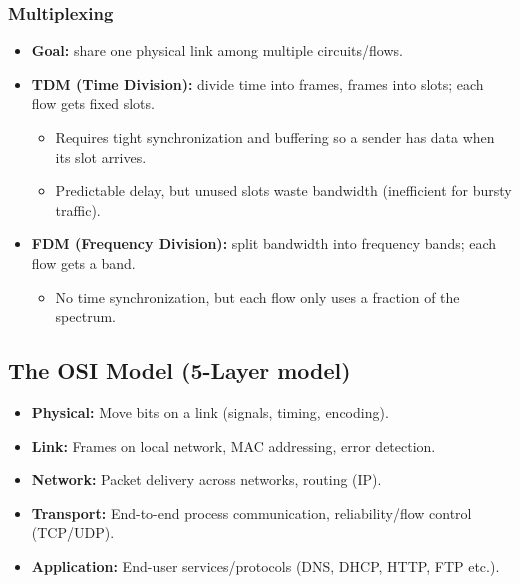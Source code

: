 \subsubsection{Multiplexing}
\begin{itemize}
    \item \textbf{Goal:} share one physical link among multiple circuits/flows.
    \item \textbf{TDM (Time Division):} divide time into frames, frames into slots; each flow gets fixed slots.
    \begin{itemize}
        \item Requires tight synchronization and buffering so a sender has data when its slot arrives.
        \item Predictable delay, but unused slots waste bandwidth (inefficient for bursty traffic).
    \end{itemize}
    \item \textbf{FDM (Frequency Division):} split bandwidth into frequency bands; each flow gets a band.
    \begin{itemize}
        \item No time synchronization, but each flow only uses a fraction of the spectrum.
    \end{itemize}
\end{itemize}

\subsection{The OSI Model (5-Layer model)}
\begin{itemize}
    \item \textbf{Physical:} Move bits on a link (signals, timing, encoding).
    \item \textbf{Link:} Frames on local network, MAC addressing, error detection.
    \item \textbf{Network:} Packet delivery across networks, routing (IP).
    \item \textbf{Transport:} End-to-end process communication, reliability/flow control (TCP/UDP).
    \item \textbf{Application:} End-user services/protocols (DNS, DHCP, HTTP, FTP etc.).
\end{itemize}
